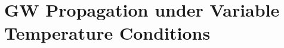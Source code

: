 
\chapter[GW Propagation under Variable Temperature Conditions]{GW Propagation under Variable Temperature Conditions}
\label{ch:tempEffects}







